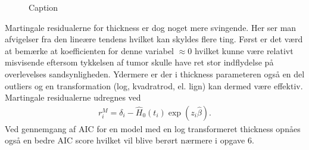 \newpage
\begin{figure}[h]
    \centering
    \hfill
  \hfill
    \caption{Caption}
    \label{fig:enter-label}
\end{figure}

\noindent Martingale residualerne for thickness er dog noget mere svingende. Her ser man afvigelser fra den lineære tendens hvilket kan skyldes flere ting. Først er det værd at bemærke at koefficienten for denne variabel $\approx 0$ hvilket kunne være relativt misvisende eftersom tykkelsen af tumor skulle have ret stor indflydelse på overlevelses sandsynligheden. Ydermere er der i thickness parameteren også en del outliers og en transformation (log, kvadratrod, el. lign) kan dermed være effektiv.
Martingale residualerne udregnes ved
\begin{align*}
    r_i^M = \delta_i - \hat{H}_0(t_i) \exp(z_i \hat{\beta}).
\end{align*}
Ved gennemgang af AIC for en model med en log transformeret thickness opnåes også en bedre AIC score hvilket vil blive berørt nærmere i opgave 6.

